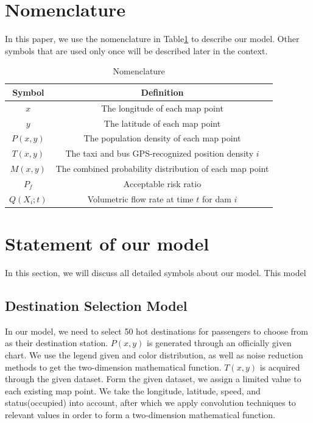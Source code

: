 \documentclass{mcmthesis}
\begin{document}
\section{Nomenclature}
In this paper, we use the nomenclature in Table\ref{tab:Nomen} to describe our model. Other symbols that are used only once will be described later in the context.
\begin{table}
    \centering
    \caption{Nomenclature}
    \label{tab:Nomen}
    \begin{tabular}{c c}
\hline
    	Symbol & Definition\\
\hline
	$x$ & The longitude of each map point\\
	$y$ & The latitude of each map point\\
	$P(x,y)$ & The population density of each map point\\
	$T(x,y)$ & The taxi and bus GPS-recognized position density $i$\\
	$M(x,y)$ & The combined probability distribution of each map point\\
	$P_f$ & Acceptable risk ratio\\
	$Q(X_i;t)$ & Volumetric flow rate at time $t$ for dam $i$\\
\hline
    \end{tabular}
\end{table}





\section{Statement of our model}
In this section, we will discuss all detailed symbols about our model. This model

\subsection{Destination Selection Model}
In our model, we need to select 50 hot destinations for passengers to choose from as their destination station. $P(x,y)$ is generated through an officially given chart. We use the legend given and color distribution, as well as noise reduction methods to get the two-dimension mathematical function. $T(x,y)$ is acquired through the given dataset. Form the given dataset, we assign a limited value to each existing map point. We take the longitude, latitude, speed, and status(occupied) into account, after which we apply convolution techniques to relevant values in order to form a two-dimension mathematical function.
\end{document}
